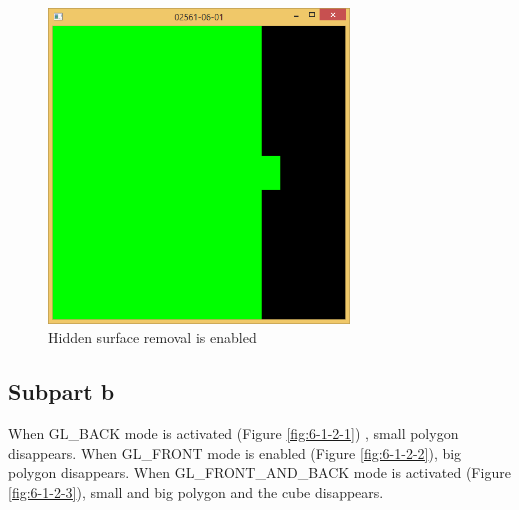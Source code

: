 \begin{figure}[hp]
\centering
\includegraphics[width=8cm]{../Screenshots/ex-6/1a-2.png}
\caption{Hidden surface removal is enabled}
\label{fig:6-1-1-2}
\end{figure}

\subsection{Subpart b}
\label{subsec:del-1-b}

When GL\_BACK mode is activated (Figure \ref{fig:6-1-2-1}) , small polygon disappears. When GL\_FRONT mode is enabled (Figure  \ref{fig:6-1-2-2}), big polygon disappears. When GL\_FRONT\_AND\_BACK mode is activated (Figure  \ref{fig:6-1-2-3}), small and big polygon and the cube disappears.


